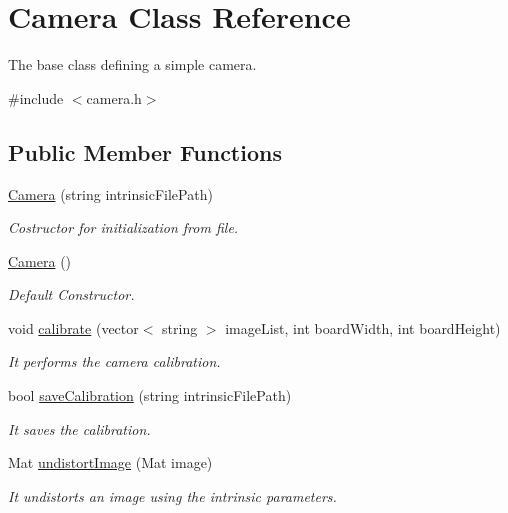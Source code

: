 \section{Camera Class Reference}
\label{classCamera}


The base class defining a simple camera.  




{\ttfamily \#include $<$camera.\+h$>$}

\subsection*{Public Member Functions}
\begin{DoxyCompactItemize}
\item 
\hyperlink{classCamera_a4a02314716bac5282edd6aee6457f133}{Camera} (string intrinsic\+File\+Path)
\begin{DoxyCompactList}\small\item\em Costructor for initialization from file. \end{DoxyCompactList}\item 
\hyperlink{classCamera_a01f94c3543f56ede7af49dc778f19331}{Camera} ()
\begin{DoxyCompactList}\small\item\em Default Constructor. \end{DoxyCompactList}\item 
void \hyperlink{classCamera_a2498b18efe884472517a430db83d9c74}{calibrate} (vector$<$ string $>$ image\+List, int board\+Width, int board\+Height)
\begin{DoxyCompactList}\small\item\em It performs the camera calibration. \end{DoxyCompactList}\item 
bool \hyperlink{classCamera_a979043e0e738bf3858de6476e12b5a67}{save\+Calibration} (string intrinsic\+File\+Path)
\begin{DoxyCompactList}\small\item\em It saves the calibration. \end{DoxyCompactList}\item 
Mat \hyperlink{classCamera_ae261c6f36e0b9c6aa40917b60ae7b1fa}{undistort\+Image} (Mat image)
\begin{DoxyCompactList}\small\item\em It undistorts an image using the intrinsic parameters. \end{DoxyCompactList}\item 

\end{DoxyCompactItemize}
